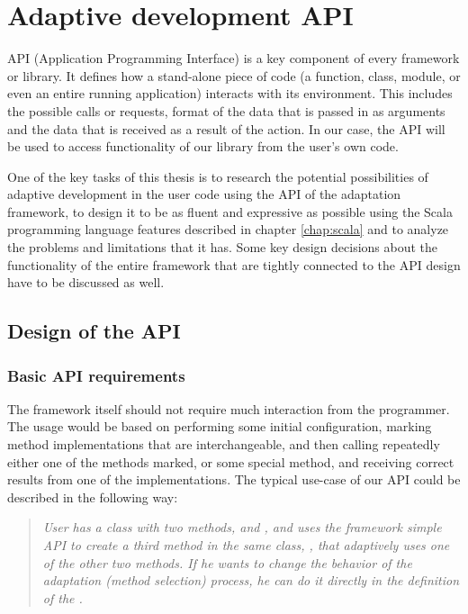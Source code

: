 \chapter{Adaptive development API}
\label{chapter:api}

API (Application Programming Interface) is a key component of every framework or library. It defines how a stand-alone piece of code (a function, class, module, or even an entire running application) interacts with its environment. This includes the possible calls or requests, format of the data that is passed in as arguments and the data that is received as a result of the action. In our case, the API will be used to access functionality of our library from the user's own code.

One of the key tasks of this thesis is to research the potential possibilities of adaptive development in the user code using the API of the adaptation framework, to design it to be as fluent and expressive as possible using the Scala programming language features described in chapter \ref{chap:scala} and to analyze the problems and limitations that it has. 
Some key design decisions about the functionality of the entire framework that are tightly connected to the API design have to be discussed as well.

\section{Design of the API}

\subsection{Basic API requirements}

The framework itself should not require much interaction from the programmer. The usage would be based on performing some initial configuration, marking method implementations that are interchangeable, and then calling repeatedly either one of the methods marked, or some special method, and receiving correct results from one of the implementations. The typical use-case of our API could be described in the following way:

\blockquote{
\textit{User has a class with two methods,  and , and uses the framework simple API to create a third method in the same class, , that adaptively uses one of the other two methods. If he wants to change the behavior of the adaptation (method selection) process, he can do it directly in the definition of the .}
}

